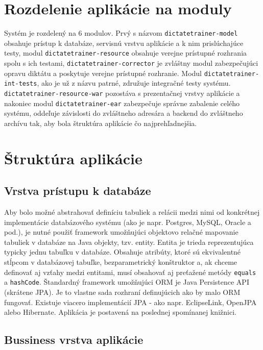\documentclass[12pt,oneside]{fithesis2}
\begin{document}
	\pagebreak
	   	\section{Rozdelenie aplikácie na moduly}
      	\par Systém je rozdelený na 6 modulov. Prvý s názvom \texttt{dictatetrainer-model} obsahuje prístup k databáze, servisnú vrstvu aplikácie a k nim prislúchajúce testy, modul \texttt{dictatetrainer-resource} obsahuje verejne prístupné rozhrania spolu s ich testami, \texttt{dictatetrainer-corrector} je zvláštny modul zabezpečujúci opravu diktátu a poskytuje verejne prístupné rozhranie. Modul \texttt{dictatetrainer-int-tests}, ako je už z názvu patrné, združuje integračné testy systému. \texttt{dictatetrainer-resource-war} pozostáva s prezentačnej vrstvy aplikácie a nakoniec modul \texttt{dictatetrainer-ear} zabezpečuje správne zabalenie celého systému, oddeľuje závislosti do zvláštneho adresára a backend do zvláštneho archívu tak, aby bola štruktúra aplikácie čo najprehľadnejšia.
    \section{Štruktúra aplikácie}
          \subsection{Vrstva prístupu k databáze}
      
      \par Aby bolo možné abstrahovať definíciu tabuliek a relácii medzi nimi od konkrétnej implementácie databázového systému (ako je napr. Postgres, MySQL, Oracle a pod.), je nutné použiť framework umožňujúci objektovo relačné mapovanie tabuliek v databáze na Java objekty, tzv. entity. Entita je trieda reprezentujúca typicky jednu tabuľku v databáze. Obsahuje atribúty, ktoré sú ekvivalentné stĺpcom v databázovej tabuľke, bezparametrický konštruktor a, ak chceme definovať aj vzťahy medzi entitami, musí obsahovať aj preťažené metódy \texttt{equals} a \texttt{hashCode}. Štandardný framework umožňujúci ORM je Java Persistence API (skrátene JPA). Je to vlastne sada rozhraní definujúcich ako by malo ORM fungovať. Existuje viacero implementácií JPA - ako napr. EclipseLink, OpenJPA alebo Hibernate. Aplikácia je postavená na poslednej spomínanej knižnici.
      
      \pagebreak

      \subsection{Bussiness vrstva aplikácie}
\end{document}
